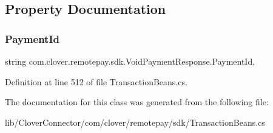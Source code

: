 \subsection{Property Documentation}
\mbox{\label{classcom_1_1clover_1_1remotepay_1_1sdk_1_1_void_payment_response_a952690e3d72ac4e86f3097900e48f80a}} 
\subsubsection{\texorpdfstring{Payment\+Id}{PaymentId}}
{\footnotesize\ttfamily string com.\+clover.\+remotepay.\+sdk.\+Void\+Payment\+Response.\+Payment\+Id\hspace{0.3cm}{\ttfamily [get]}, {\ttfamily [set]}}



Definition at line 512 of file Transaction\+Beans.\+cs.



The documentation for this class was generated from the following file\+:\begin{DoxyCompactItemize}
\item 
lib/\+Clover\+Connector/com/clover/remotepay/sdk/Transaction\+Beans.\+cs\end{DoxyCompactItemize}

